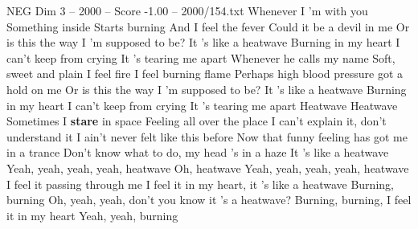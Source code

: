 \begin{textsample}{NEG Dim 3 – 2000 – Score -1.00 – 2000/154.txt}  \label{ex:f3_neg_014}
Whenever I 'm with you Something inside Starts burning And I feel the fever Could it be a devil in me Or is this the way I 'm supposed to be?
It 's like a heatwave Burning in my heart I can't keep from crying It 's tearing me apart Whenever he calls my name Soft, sweet and plain I feel fire I feel burning flame Perhaps high blood pressure got a hold on me Or is this the way I 'm supposed to be?
It 's like a heatwave Burning in my heart I can't keep from crying It 's tearing me apart Heatwave Heatwave Sometimes I \textbf{stare} in space Feeling all over the place I can't explain it, don't understand it I ain't never felt like this before Now that funny feeling has got me in a trance Don't know what to do, my head 's in a haze It 's like a heatwave Yeah, yeah, yeah, yeah, heatwave Oh, heatwave Yeah, yeah, yeah, yeah, heatwave I feel it passing through me I feel it in my heart, it 's like a heatwave Burning, burning Oh, yeah, yeah, don't you know it 's a heatwave?
Burning, burning, I feel it in my heart Yeah, yeah, burning

\end{textsample}
